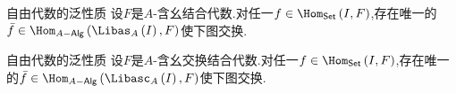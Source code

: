 \begin{proposition}{自由代数的泛性质}{}
	设$F$是$A$-含幺结合代数.对任一$f\in\Hom_{\mathsf{Set}}\left(I,F\right)$,存在唯一的$\bar{f}\in\Hom_{A-\mathsf{Alg}}\left(\Libas_{A}\left(I\right),F\right)$使下图交换.
	\begin{center}
	\end{center}
\end{proposition}

\begin{proposition}{自由代数的泛性质}{}
	设$F$是$A$-含幺交换结合代数.对任一$f\in\Hom_{\mathsf{Set}}\left(I,F\right)$,存在唯一的$\bar{f}\in\Hom_{A-\mathsf{Alg}}\left(\Libasc_{A}\left(I\right),F\right)$使下图交换.
	\begin{center}
	\end{center}
\end{proposition}

